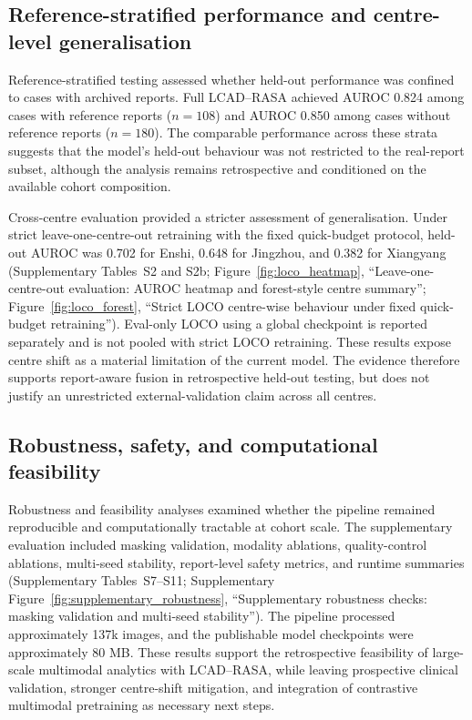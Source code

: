 \subsection{Reference-stratified performance and centre-level generalisation}
\label{subsec:loco_results}

Reference-stratified testing assessed whether held-out performance was confined to cases with archived reports. Full LCAD--RASA achieved AUROC 0.824 among cases with reference reports ($n=108$) and AUROC 0.850 among cases without reference reports ($n=180$). The comparable performance across these strata suggests that the model's held-out behaviour was not restricted to the real-report subset, although the analysis remains retrospective and conditioned on the available cohort composition.

Cross-centre evaluation provided a stricter assessment of generalisation. Under strict leave-one-centre-out retraining with the fixed quick-budget protocol, held-out AUROC was 0.702 for Enshi, 0.648 for Jingzhou, and 0.382 for Xiangyang (Supplementary Tables~S2 and S2b; Figure~\ref{fig:loco_heatmap}, ``Leave-one-centre-out evaluation: AUROC heatmap and forest-style centre summary''; Figure~\ref{fig:loco_forest}, ``Strict LOCO centre-wise behaviour under fixed quick-budget retraining''). Eval-only LOCO using a global checkpoint is reported separately and is not pooled with strict LOCO retraining. These results expose centre shift as a material limitation of the current model. The evidence therefore supports report-aware fusion in retrospective held-out testing, but does not justify an unrestricted external-validation claim across all centres.

\subsection{Robustness, safety, and computational feasibility}
\label{subsec:robustness_safety_scalability}

Robustness and feasibility analyses examined whether the pipeline remained reproducible and computationally tractable at cohort scale. The supplementary evaluation included masking validation, modality ablations, quality-control ablations, multi-seed stability, report-level safety metrics, and runtime summaries (Supplementary Tables~S7--S11; Supplementary Figure~\ref{fig:supplementary_robustness}, ``Supplementary robustness checks: masking validation and multi-seed stability''). The pipeline processed approximately 137k images, and the publishable model checkpoints were approximately 80 MB. These results support the retrospective feasibility of large-scale multimodal analytics with LCAD--RASA, while leaving prospective clinical validation, stronger centre-shift mitigation, and integration of contrastive multimodal pretraining as necessary next steps.
